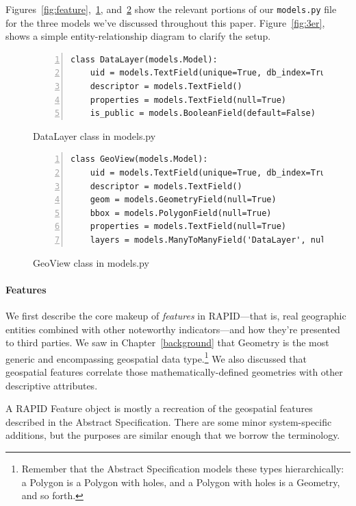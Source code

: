 Figures~\ref{fig:feature},~\ref{fig:datalayer}, and~\ref{fig:geoview} show the relevant portions of our \texttt{models.py} file for the three models we've discussed throughout this paper. Figure~\ref{fig:3er}, shows a simple entity-relationship diagram to clarify the setup.


\begin{figure}
\caption{DataLayer class in models.py}
\begin{Verbatim}[samepage=true,baselinestretch=1,numbers=left,xleftmargin=12mm]
class DataLayer(models.Model):
    uid = models.TextField(unique=True, db_index=True)
    descriptor = models.TextField()
    properties = models.TextField(null=True)
    is_public = models.BooleanField(default=False)
\end{Verbatim}
\label{fig:datalayer}
\end{figure}

\begin{figure}
\caption{GeoView class in models.py}
\begin{Verbatim}[samepage=true,baselinestretch=1,numbers=left,xleftmargin=12mm]
class GeoView(models.Model):
    uid = models.TextField(unique=True, db_index=True)
    descriptor = models.TextField()
    geom = models.GeometryField(null=True)
    bbox = models.PolygonField(null=True)
    properties = models.TextField(null=True)
    layers = models.ManyToManyField('DataLayer', null=True)
\end{Verbatim}
\label{fig:geoview}
\end{figure}

\paragraph{Features}
We first describe the core makeup of \textit{features} in RAPID---that is, real geographic entities combined with other noteworthy indicators---and how they're presented to third parties. We saw in Chapter~\ref{background} that Geometry is the most generic and encompassing geospatial data type.\footnote{Remember that the Abstract Specification models these types hierarchically: a Polygon is a Polygon with holes, and a Polygon with holes is a Geometry, and so forth.} We also discussed that geospatial features correlate those mathematically-defined geometries with other descriptive attributes.

A RAPID Feature object is mostly a recreation of the geospatial features described in the Abstract Specification. There are some minor system-specific additions, but the purposes are similar enough that we borrow the terminology.

